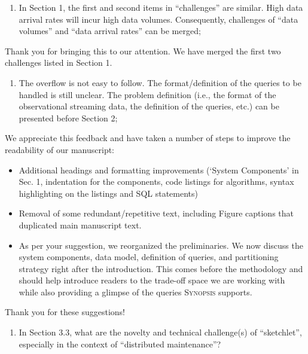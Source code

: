 \documentclass{article}
\begin{document}
\begin{enumerate}
\def\labelenumi{(\arabic{enumi})}
\item
  In Section 1, the first and second items in ``challenges'' are
  similar. High data arrival rates will incur high data volumes.
  Consequently, challenges of ``data volumes'' and ``data arrival
  rates'' can be merged;
\end{enumerate}

\begin{tcolorbox}
Thank you for bringing this to our attention. We have merged the first two challenges listed in Section 1.
\end{tcolorbox}

\begin{enumerate}
\def\labelenumi{(\arabic{enumi})}
\setcounter{enumi}{1}
\item
  The overflow is not easy to follow. The format/definition of the
  queries to be handled is still unclear. The problem definition (i.e.,
  the format of the observational streaming data, the definition of the
  queries, etc.) can be presented before Section 2;
\end{enumerate}

\begin{tcolorbox}
We appreciate this feedback and have taken a number of steps to improve the readability of our manuscript:

\begin{itemize}
\item Additional headings and formatting improvements (`System Components' in Sec. 1, indentation for the components, code listings for algorithms, syntax highlighting on the listings and SQL statements)
\item Removal of some redundant/repetitive text, including Figure captions that duplicated main manuscript text.
\item As per your suggestion, we reorganized the preliminaries. We now discuss the system components, data model, definition of queries, and partitioning strategy right after the introduction. This comes before the methodology and should help introduce readers to the trade-off space we are working with while also providing a glimpse of the queries \textsc{Synopsis} supports.
\end{itemize}
%
Thank you for these suggestions!
\end{tcolorbox}

\begin{enumerate}
\def\labelenumi{(\arabic{enumi})}
\setcounter{enumi}{2}
\item
  In Section 3.3, what are the novelty and technical challenge(s) of
  ``sketchlet'', especially in the context of ``distributed
  maintenance''?
\end{enumerate}
\end{document}
